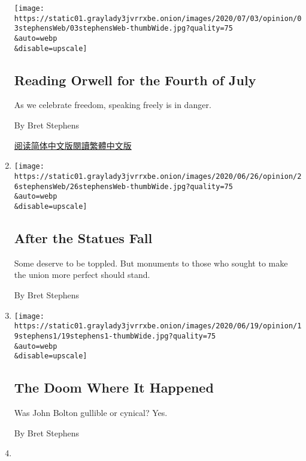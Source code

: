 \begin{enumerate}
  \texttt{[image: https://static01.graylady3jvrrxbe.onion/images/2020/07/03/opinion/03stephensWeb/03stephensWeb-thumbWide.jpg?quality=75\\\&auto=webp\\\&disable=upscale]}

  \hypertarget{reading-orwell-for-the-fourth-of-july}{%
  \subsection{Reading Orwell for the Fourth of
  July}\label{reading-orwell-for-the-fourth-of-july}}

  As we celebrate freedom, speaking freely is in danger.

  By Bret Stephens

  \href{https://cn.nytimes3xbfgragh.onion/opinion/20200706/orwell-fourth-of-july/}{阅读简体中文版}\href{https://cn.nytimes3xbfgragh.onion/opinion/20200706/orwell-fourth-of-july/zh-hant/}{閱讀繁體中文版}
\item
  \href{/2020/06/26/opinion/statues-protests.html}{}

  \texttt{[image: https://static01.graylady3jvrrxbe.onion/images/2020/06/26/opinion/26stephensWeb/26stephensWeb-thumbWide.jpg?quality=75\\\&auto=webp\\\&disable=upscale]}

  \hypertarget{after-the-statues-fall}{%
  \subsection{After the Statues Fall}\label{after-the-statues-fall}}

  Some deserve to be toppled. But monuments to those who sought to make
  the union more perfect should stand.

  By Bret Stephens
\item
  \href{/2020/06/19/opinion/bolton-book.html}{}

  \texttt{[image: https://static01.graylady3jvrrxbe.onion/images/2020/06/19/opinion/19stephens1/19stephens1-thumbWide.jpg?quality=75\\\&auto=webp\\\&disable=upscale]}

  \hypertarget{the-doom-where-it-happened}{%
  \subsection{The Doom Where It
  Happened}\label{the-doom-where-it-happened}}

  Was John Bolton gullible or cynical? Yes.

  By Bret Stephens
\item
  \href{/2020/06/12/opinion/tom-cotton-op-ed.html}{}


\end{enumerate}
